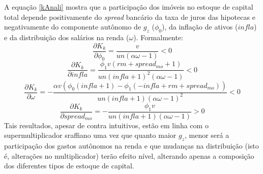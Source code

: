 A equação \ref{kAnali} mostra que a participação dos imóveis no estoque de capital total depende 
positivamente do \textit{spread} bancário da taxa de juros das hipotecas e 
negativamente do componente autônomo de $g_z$ ($\phi_0$), da inflação de ativos ($infla$) e da distribuição dos salários na renda ($\omega$). Formalmente:
\begin{equation}
\frac{\partial K_k}{\partial \phi_0} = \frac{v}{un \left(\alpha \omega - 1\right)} < 0
\end{equation}
\begin{equation}
\frac{\partial K_k}{\partial infla} = \frac{\phi_{1} v \left(rm + spread_{mo} + 1\right)}{un \left(infla + 1\right)^{2} \left(\alpha \omega - 1\right)} < 0
\end{equation}
\begin{equation}
\frac{\partial K_k}{\partial \omega} = - \frac{\alpha v \left(\phi_{0} \left(infla + 1\right) - \phi_{1} \left(- infla + rm + spread_{mo}\right)\right)}{un \left(infla + 1\right) \left(\alpha \omega - 1\right)^{2}} < 0
\end{equation}
\begin{equation}
\frac{\partial K_k}{\partial spread_{mo}} = - \frac{\phi_{1} v}{un \left(infla + 1\right) \left(\alpha \omega - 1\right)} > 0
\end{equation}
Tais resultados, apesar de contra intuitivos, estão em linha com o supermultiplicador sraffiano uma vez que quanto maior $g_z$, menor será a participação dos gastos autônomos na renda e que mudanças na distribuição (isto é, alterações no multiplicador) terão efeito nível, alterando apenas a composição dos diferentes tipos de estoque de capital. 



